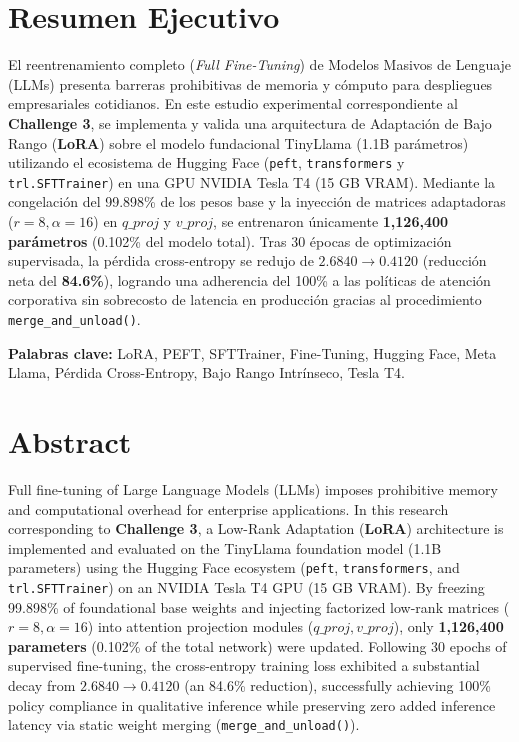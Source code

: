 \documentclass[12pt,letterpaper]{article}
\begin{document}
\section*{Resumen Ejecutivo}
El reentrenamiento completo (\textit{Full Fine-Tuning}) de Modelos Masivos de Lenguaje (LLMs) presenta barreras prohibitivas de memoria y cómputo para despliegues empresariales cotidianos. En este estudio experimental correspondiente al \textbf{Challenge 3}, se implementa y valida una arquitectura de Adaptación de Bajo Rango (\textbf{LoRA}) sobre el modelo fundacional TinyLlama (1.1B parámetros) utilizando el ecosistema de Hugging Face (\texttt{peft}, \texttt{transformers} y \texttt{trl.SFTTrainer}) en una GPU NVIDIA Tesla T4 (15 GB VRAM). Mediante la congelación del 99.898\% de los pesos base y la inyección de matrices adaptadoras ($r=8, \alpha=16$) en $q\_proj$ y $v\_proj$, se entrenaron únicamente \textbf{1,126,400 parámetros} (0.102\% del modelo total). Tras 30 épocas de optimización supervisada, la pérdida cross-entropy se redujo de \textbf{$2.6840 \rightarrow 0.4120$} (reducción neta del \textbf{84.6\%}), logrando una adherencia del 100\% a las políticas de atención corporativa sin sobrecosto de latencia en producción gracias al procedimiento \texttt{merge\_and\_unload()}.

\vspace{0.5cm}
\noindent\textbf{Palabras clave:} LoRA, PEFT, SFTTrainer, Fine-Tuning, Hugging Face, Meta Llama, Pérdida Cross-Entropy, Bajo Rango Intrínseco, Tesla T4.

\vspace{1.5cm}
\section*{Abstract}
Full fine-tuning of Large Language Models (LLMs) imposes prohibitive memory and computational overhead for enterprise applications. In this research corresponding to \textbf{Challenge 3}, a Low-Rank Adaptation (\textbf{LoRA}) architecture is implemented and evaluated on the TinyLlama foundation model (1.1B parameters) using the Hugging Face ecosystem (\texttt{peft}, \texttt{transformers}, and \texttt{trl.SFTTrainer}) on an NVIDIA Tesla T4 GPU (15 GB VRAM). By freezing 99.898\% of foundational base weights and injecting factorized low-rank matrices ($r=8, \alpha=16$) into attention projection modules ($q\_proj, v\_proj$), only \textbf{1,126,400 parameters} (0.102\% of the total network) were updated. Following 30 epochs of supervised fine-tuning, the cross-entropy training loss exhibited a substantial decay from \textbf{$2.6840 \rightarrow 0.4120$} (an 84.6\% reduction), successfully achieving 100\% policy compliance in qualitative inference while preserving zero added inference latency via static weight merging (\texttt{merge\_and\_unload()}).
\end{document}
